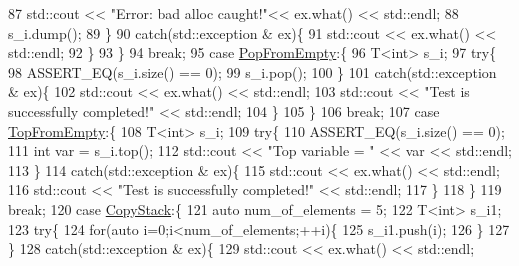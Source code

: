 \begin{DoxyCode}
87                     std::cout << \textcolor{stringliteral}{"Error: bad alloc caught!"}<< ex.what() << std::endl;
88                     s\_i.dump(); 
89                 \}
90                 \textcolor{keywordflow}{catch}(std::exception & ex)\{
91                     std::cout << ex.what() << std::endl;
92                 \}
93                                 \}
94                 \textcolor{keywordflow}{break};
95             \textcolor{keywordflow}{case} \hyperlink{namespacestk__test_aee7ec7a767abf7b0b65ce9a2afb7de78ae9c603d2f7d582fd4fdd5db8140ceecf}{PopFromEmpty}:\{
96                 T<int> s\_i;
97                 \textcolor{keywordflow}{try}\{
98                     ASSERT\_EQ(s\_i.size() == 0);
99                     s\_i.pop();
100                 \}
101                 \textcolor{keywordflow}{catch}(std::exception & ex)\{
102                     std::cout << ex.what() << std::endl;
103                     std::cout << \textcolor{stringliteral}{"Test is successfully completed!"} << std::endl;
104                 \}
105                               \}
106                 \textcolor{keywordflow}{break};
107             \textcolor{keywordflow}{case} \hyperlink{namespacestk__test_aee7ec7a767abf7b0b65ce9a2afb7de78acd574f7057fc049aa4da1da5f4b7fd3a}{TopFromEmpty}:\{
108                 T<int> s\_i;
109                 \textcolor{keywordflow}{try}\{
110                     ASSERT\_EQ(s\_i.size() == 0);
111                     \textcolor{keywordtype}{int} var = s\_i.top();
112                     std::cout << \textcolor{stringliteral}{"Top variable = "} << var << std::endl;
113                 \}
114                 \textcolor{keywordflow}{catch}(std::exception & ex)\{
115                     std::cout << ex.what() << std::endl;
116                     std::cout << \textcolor{stringliteral}{"Test is successfully completed!"} << std::endl;
117                 \}
118                               \}
119                 \textcolor{keywordflow}{break};
120             \textcolor{keywordflow}{case} \hyperlink{namespacestk__test_aee7ec7a767abf7b0b65ce9a2afb7de78aef89859ac32f020e99414e3d3e559713}{CopyStack}:\{
121                 \textcolor{keyword}{auto} num\_of\_elements = 5;
122                 T<int> s\_i1;
123                 \textcolor{keywordflow}{try}\{
124                     \textcolor{keywordflow}{for}(\textcolor{keyword}{auto} i=0;i<num\_of\_elements;++i)\{
125                         s\_i1.push(i);
126                     \}
127                 \}
128                 \textcolor{keywordflow}{catch}(std::exception & ex)\{
129                     std::cout << ex.what() << std::endl;

\end{DoxyCode}
